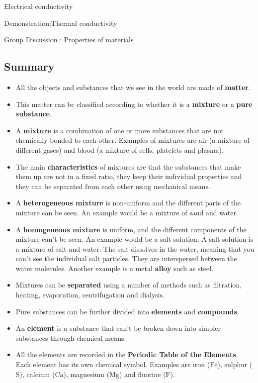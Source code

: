 \begin{iexperiment}{Electrical conductivity}
\begin{gexperiment}{Demonstration:Thermal conductivity}
\begin{Discussion}{Group Discussion : Properties of materials}
            \subsection{ Summary}
            \nopagebreak
      \label{m38706*id67458}\begin{itemize}[noitemsep]
            \label{m38706*uid114}\item All the objects and substances that we see in the world are made of \textbf{matter}.
\label{m38706*uid115}\item This matter can be classified according to whether it is a \textbf{mixture} or a \textbf{pure substance}.
\label{m38706*uid116}\item A \textbf{mixture} is a combination of one or more substances that are not chemically bonded to each other. Examples of mixtures are air (a mixture of different gases) and blood (a mixture of cells, platelets and plasma).
\label{m38706*uid117}\item The main \textbf{characteristics} of mixtures are that the substances that make them up are not in a fixed ratio, they keep their individual properties and they can be separated from each other using mechanical means.
\label{m38706*uid118}\item A \textbf{heterogeneous mixture} is non-uniform and the different parts of the mixture can be seen. An example would be a mixture of sand and water.
\label{m38706*uid119}\item A \textbf{homogeneous mixture} is uniform, and the different components of the mixture can't be seen. An example would be a salt solution. A salt solution is a mixture of salt and water. The salt dissolves in the water, meaning that you can't see the individual salt particles. They are interspersed between the water molecules. Another example is a metal \textbf{alloy} such as steel.
\label{m38706*uid120}\item Mixtures can be \textbf{separated} using a number of methods such as filtration, heating, evaporation, centrifugation and dialysis.
\label{m38706*uid121}\item Pure substances can be further divided into \textbf{elements} and \textbf{compounds}.
\label{m38706*uid122}\item An \textbf{element} is a substance that can't be broken down into simpler substances through chemical means.
\label{m38706*uid123}\item All the elements are recorded in the \textbf{Periodic Table of the Elements}. Each element has its own chemical symbol. Examples are iron ($\mathrm{Fe}$), sulphur ($\mathrm{S}$), calcium ($\mathrm{Ca}$), magnesium ($\mathrm{Mg}$) and fluorine ($\mathrm{F}$).

\end{itemize}
\end{Discussion}
\end{gexperiment}
\end{iexperiment}
